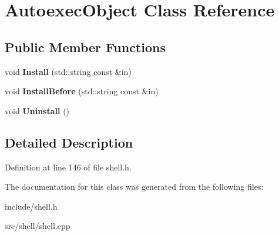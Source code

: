 \hypertarget{classAutoexecObject}{\section{Autoexec\-Object Class Reference}
\label{classAutoexecObject}
}
\subsection*{Public Member Functions}
\begin{DoxyCompactItemize}
\item 
\hypertarget{classAutoexecObject_a30b975e4cf89783c6e56025c60479ca1}{void {\bfseries Install} (std\-::string const \&in)}\label{classAutoexecObject_a30b975e4cf89783c6e56025c60479ca1}

\item 
\hypertarget{classAutoexecObject_a006d09ad8eef5bc34e1d72778a96cce6}{void {\bfseries Install\-Before} (std\-::string const \&in)}\label{classAutoexecObject_a006d09ad8eef5bc34e1d72778a96cce6}

\item 
\hypertarget{classAutoexecObject_a62d93cd9fdbf05b70f05410ae7bb73df}{void {\bfseries Uninstall} ()}\label{classAutoexecObject_a62d93cd9fdbf05b70f05410ae7bb73df}

\end{DoxyCompactItemize}


\subsection{Detailed Description}


Definition at line 146 of file shell.\-h.



The documentation for this class was generated from the following files\-:\begin{DoxyCompactItemize}
\item 
include/shell.\-h\item 
src/shell/shell.\-cpp\end{DoxyCompactItemize}
